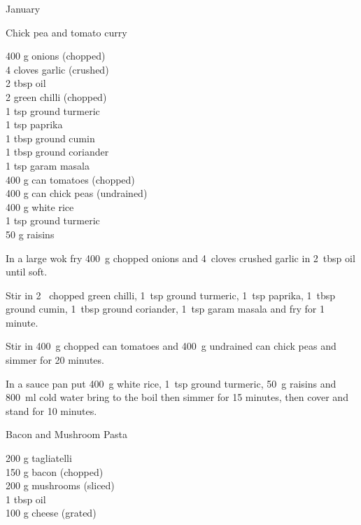 \begin{menu}{January}
    \begin{recipe}{2}{Chick pea and tomato curry}%
		\begin{ingredients}
		400 g onions (chopped) \\
	4 cloves garlic (crushed) \\
	2 tbsp oil  \\
	2  green chilli (chopped) \\
	1 tsp ground turmeric  \\
	1 tsp paprika  \\
	1 tbsp ground cumin  \\
	1 tbsp ground coriander  \\
	1 tsp garam masala  \\
	400 g can tomatoes (chopped) \\
	400 g can chick peas (undrained) \\
	400 g white rice  \\
	1 tsp ground turmeric  \\
	50 g raisins  \\
	
		\end{ingredients}
	
	
    \begin{instructions}
    \item 
        In a large wok fry
        400~g chopped onions
        and
        4~cloves crushed garlic
        in
        2~tbsp  oil
        until soft.
      \item 
        Stir in
        2~ chopped green chilli,
        1~tsp  ground turmeric,
        1~tsp  paprika,
        1~tbsp  ground cumin,
        1~tbsp  ground coriander,
        1~tsp  garam masala
        and fry for 1 minute.
      \item 
        Stir in
        400~g chopped can tomatoes
        and
        400~g undrained can chick peas
        and simmer for 20 minutes.
      \item 
      In a
      sauce pan
      put
      400~g  white rice,
      1~tsp  ground turmeric,
      50~g  raisins
      and
      800~ml  cold water
      bring to the boil then simmer for 15 minutes,
      then cover and stand for 10 minutes.
    
    \end{instructions}
    \end{recipe}%
  
    \begin{recipe}{1}{Bacon and Mushroom Pasta}%
		\begin{ingredients}
		200 g tagliatelli  \\
	150 g bacon (chopped) \\
	200 g mushrooms (sliced) \\
	1 tbsp oil  \\
	100 g cheese (grated) \\
	

\end{ingredients}
\end{recipe}
\end{menu}
